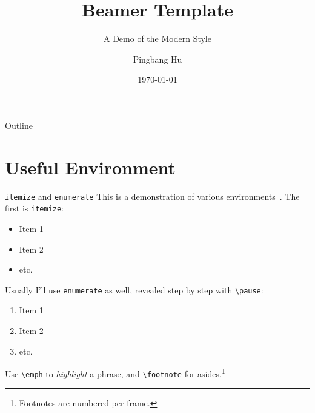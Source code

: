 \documentclass[aspectratio=169,10pt]{beamer}
\title{Beamer Template}
\subtitle{A Demo of the Modern Style}
\date{\today}
\author{Pingbang Hu}
\institute{University of Illinois Urbana-Champaign}
\begin{document}
\maketitle

\begin{frame}{Outline}
    \tableofcontents[hideallsubsections]
\end{frame}

\section{Useful Environment}

\begin{frame}{\texttt{itemize} and \texttt{enumerate}}
    This is a demonstration of various environments~\cite{HuLaTeXTemplate}. The first is \texttt{itemize}:
    \begin{itemize}
        \item Item 1
        \item Item 2
        \item etc.
    \end{itemize}
    \pause

    \medskip
    Usually I'll use \texttt{enumerate} as well, revealed step by step with \texttt{\textbackslash pause}:
    \begin{enumerate}
        \item Item 1 \pause
        \item Item 2 \pause
        \item etc.
    \end{enumerate}
    \pause

    \medskip
    Use \texttt{\textbackslash emph} to \emph{highlight} a phrase, and \texttt{\textbackslash footnote} for asides.\footnote{Footnotes are numbered per frame.}
\end{frame}
\end{document}
